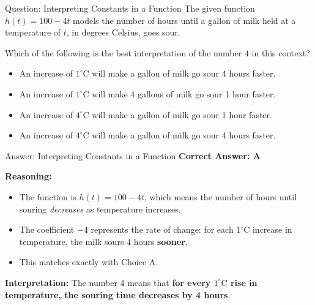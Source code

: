 \documentclass{beamer}
\begin{document}
\begin{frame}{Question: Interpreting Constants in a Function}
The given function \( h(t) = 100 - 4t \) models the number of hours until a gallon of milk held at a temperature of \( t \), in degrees Celsius, goes sour.

\vspace{0.5em}
Which of the following is the best interpretation of the number \( 4 \) in this context?

\vspace{0.5em}
\begin{itemize}
    \item[\textbf{A.}] An increase of \(1^\circ\text{C}\) will make a gallon of milk go sour 4 hours faster.
    \item[\textbf{B.}] An increase of \(1^\circ\text{C}\) will make 4 gallons of milk go sour 1 hour faster.
    \item[\textbf{C.}] An increase of \(4^\circ\text{C}\) will make a gallon of milk go sour 1 hour faster.
    \item[\textbf{D.}] An increase of \(4^\circ\text{C}\) will make a gallon of milk go sour 4 hours faster.
\end{itemize}
\end{frame}


\begin{frame}{Answer: Interpreting Constants in a Function}
\textbf{Correct Answer: \textcolor{novelPurple}{A}}  

\vspace{0.5em}
\textbf{Reasoning:}
\begin{itemize}
    \item The function is \( h(t) = 100 - 4t \), which means the number of hours until souring \emph{decreases} as temperature increases.
    \item The coefficient \( -4 \) represents the rate of change: for each \(1^\circ\text{C}\) increase in temperature, the milk sours 4 hours \textbf{sooner}.
    \item This matches exactly with Choice A.
\end{itemize}

\vspace{0.5em}
\textbf{Interpretation:}  
The number 4 means that \textbf{for every \(1^\circ\text{C}\) rise in temperature, the souring time decreases by 4 hours}.
\end{frame}
\end{document}
